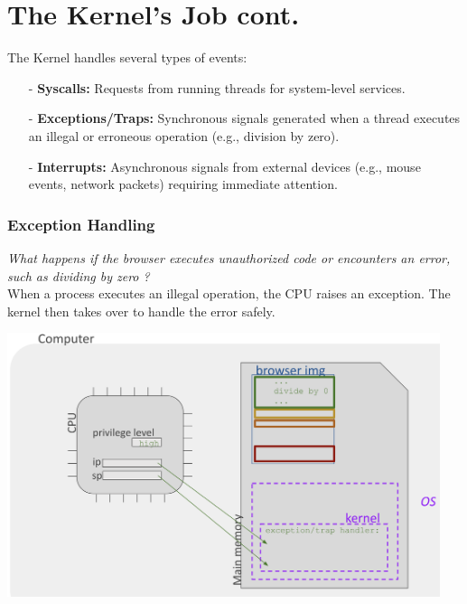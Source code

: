 \documentclass[../../compsys.tex]{subfiles}
\begin{document}
\section{The Kernel's Job cont.}
The Kernel handles several types of events:
\begin{itemize}[topsep=3px]
  \item[-] \textbf{Syscalls:} Requests from running threads for system-level services.
  \item[-] \textbf{Exceptions/Traps:} Synchronous signals generated when a thread executes an illegal or erroneous operation (e.g., division by zero).
  \item[-] \textbf{Interrupts:} Asynchronous signals from external devices (e.g., mouse events, network packets) requiring immediate attention.
\end{itemize}
\vspace{10px}
\begin{minipage}[htp]{0.45\textwidth}
\subsubsection*{Exception Handling}
\textit{What happens if the browser executes unauthorized code or encounters an error, such as dividing by zero ?}\\
When a process executes an illegal operation, the CPU raises an exception. The kernel then takes over to handle the error safely.
\vspace{8px}
\begin{center}
  \includegraphics[width=0.95\textwidth]{chapters/L3/images/exception.png}
\end{center}
\end{minipage} 
\hfill 
\vline 
\hfill 
\end{document}
